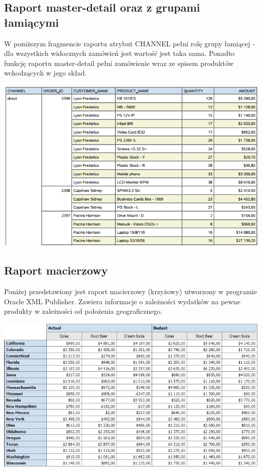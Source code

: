 \documentclass[11pt,a4paper]{article}
\begin{document}
\subsection{Raport master-detail oraz z grupami łamiącymi}
W poniższym fragmencie raportu atrybut CHANNEL pełni rolę grupy łamiącej - dla wszystkich widocznych zamówień jest wartość jest taka sama. Ponadto funkcję raportu master-detail pełni zamówienie wraz ze spisem produktów wchodzących w jego skład.

\includegraphics[scale=0.75]{master_detail_publisher}

\subsection{Raport macierzowy}
Poniżej przedstawiony jest raport macierzowy (krzyżowy) utworzony w programie Oracle XML Publisher. Zawiera informacje o zależności wydatków na pewne produkty w zależności od położenia geograficznego.

\includegraphics[scale=0.75]{crosstab_publisher}
\end{document}
